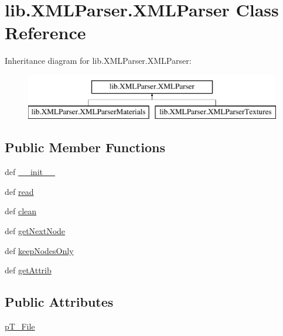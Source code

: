 \hypertarget{classlib_1_1_x_m_l_parser_1_1_x_m_l_parser}{\section{lib.\-X\-M\-L\-Parser.\-X\-M\-L\-Parser Class Reference}
\label{classlib_1_1_x_m_l_parser_1_1_x_m_l_parser}
}
Inheritance diagram for lib.\-X\-M\-L\-Parser.\-X\-M\-L\-Parser\-:\begin{figure}[H]
\begin{center}
\leavevmode
\includegraphics[height=2.000000cm]{classlib_1_1_x_m_l_parser_1_1_x_m_l_parser}
\end{center}
\end{figure}
\subsection*{Public Member Functions}
\begin{DoxyCompactItemize}
\item 
def \hyperlink{classlib_1_1_x_m_l_parser_1_1_x_m_l_parser_aed715c7deac13aa921d981d173fbfcdb}{\-\_\-\-\_\-init\-\_\-\-\_\-}
\item 
def \hyperlink{classlib_1_1_x_m_l_parser_1_1_x_m_l_parser_aeb2e4950b09d3d46457b3246ad7c470c}{read}
\item 
def \hyperlink{classlib_1_1_x_m_l_parser_1_1_x_m_l_parser_addaf0aef3b3b2b600fc08e3172175c2c}{clean}
\item 
def \hyperlink{classlib_1_1_x_m_l_parser_1_1_x_m_l_parser_a341e8e7a1ca7072d733c5a39b04476be}{get\-Next\-Node}
\item 
def \hyperlink{classlib_1_1_x_m_l_parser_1_1_x_m_l_parser_a89937566b919aade4c75ae43840c3d59}{keep\-Nodes\-Only}
\item 
def \hyperlink{classlib_1_1_x_m_l_parser_1_1_x_m_l_parser_a6afafcfd267a9d7e9e9eec3f423485c9}{get\-Attrib}
\end{DoxyCompactItemize}
\subsection*{Public Attributes}
\begin{DoxyCompactItemize}
\item 
\hyperlink{classlib_1_1_x_m_l_parser_1_1_x_m_l_parser_ac04113caa7925d6df922f9c0844e2c42}{p\-T\-\_\-\-File}
\end{DoxyCompactItemize}


